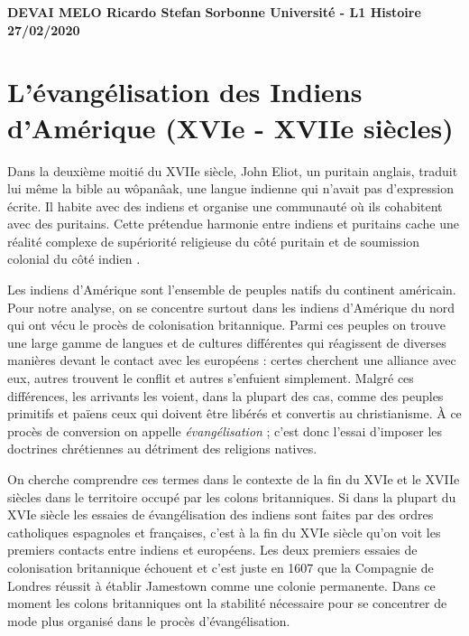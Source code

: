 \documentclass{article}
\begin{document}
\begin{flushright}
\textbf{DEVAI MELO Ricardo Stefan}
\linebreak
\textbf{Sorbonne Université - L1 Histoire}
\linebreak
\textbf{27/02/2020}
\linebreak
\end{flushright}

\section*{L'évangélisation des Indiens d'Amérique (XVIe - XVIIe siècles)}

Dans la deuxième moitié du XVIIe siècle, John Eliot, un puritain anglais, traduit lui même la bible au wôpanâak, une langue indienne qui n'avait pas d'expression écrite. Il habite avec des indiens et organise une communauté où ils cohabitent avec des puritains. Cette prétendue harmonie entre indiens et puritains cache une réalité complexe de supériorité religieuse du côté puritain et de soumission colonial du côté indien \cite{eliot2-1}.

Les indiens d'Amérique sont l'ensemble de peuples natifs du continent américain. Pour notre analyse, on se concentre surtout dans les indiens d'Amérique du nord qui ont vécu le procès de colonisation britannique. Parmi ces peuples on trouve une large gamme de langues et de cultures différentes qui réagissent de diverses manières devant le contact avec les européens : certes cherchent une alliance avec eux, autres trouvent le conflit et autres s'enfuient simplement. Malgré ces différences, les arrivants les voient, dans la plupart des cas, comme des peuples primitifs et païens ceux qui doivent être libérés et convertis au christianisme. À ce procès de conversion on appelle \emph{évangélisation} ; c'est donc l'essai d'imposer les doctrines chrétiennes au détriment des religions natives.

On cherche comprendre ces termes dans le contexte de la fin du XVIe et le XVIIe siècles dans le territoire occupé par les colons britanniques. Si dans la plupart du XVIe siècle les essaies de évangélisation des indiens sont faites par des ordres catholiques espagnoles et françaises, c'est à la fin du XVIe siècle qu'on voit les premiers contacts entre indiens et européens. Les deux premiers essaies de colonisation britannique échouent et c'est juste en 1607 que la Compagnie de Londres réussit à établir Jamestown comme une colonie permanente. Dans ce moment les colons britanniques ont la stabilité nécessaire pour se concentrer de mode plus organisé dans le procès d'évangélisation.
\end{document}
